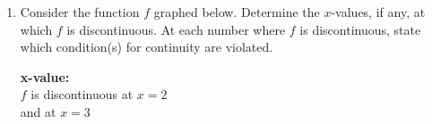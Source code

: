\documentclass[11pt]{article}
\begin{document}
\begin{enumerate}
\begin{enumerate}
    i. \rule{4.7cm}{0.4pt}
    {\color{blue}$f(a)$ is defined}
    \rule{4.7cm}{0.4pt}
    \vspace{0.5cm} \\

    ii. \rule{4.65cm}{0.4pt}
    {\color{blue}$\displaystyle \lim_{x\to a} f(x)$ exists}
    \rule{4.65cm}{0.4pt}
    \vspace{0.5cm} \\

    iii. \rule{4.5cm}{0.4pt}
    {\color{blue}$\displaystyle \lim_{x\to a} f(x) = f(a)$}
    \rule{4.5cm}{0.4pt}
    \vspace{0.5cm} \\


    \item[(b)] Consider the function \(f\) graphed below. Determine the \(x\)-values, if any, at which \(f\) is discontinuous. At each number where \(f\) is discontinuous, state which condition(s) for continuity are violated.

 \noindent
\begin{minipage}[t]{0.55\textwidth}
\vspace{0pt}
\end{minipage}
\hspace{1em} %
\begin{minipage}[t]{0.40\textwidth}
\vspace{0pt}
\textbf{x-value:}\\
{\color{blue}
$f$ is discontinuous at
$x=2$\\ and at $x=3$}
\vspace{2.5cm}


\end{minipage}
\end{enumerate}
\end{enumerate}
\end{document}

